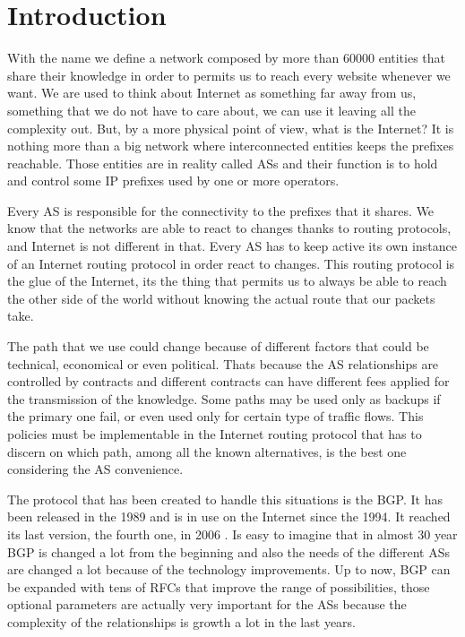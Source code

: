 \chapter{Introduction}
\label{cha:introduction}



With the name  we define a network composed by more than \num{60000}
entities that share their knowledge in order to permits us to reach every website
whenever we want.
We are used to think about Internet as something far away from us, something
that we do not have to care about, we can use it leaving all the complexity
out.
But, by a more physical point of view, what is the Internet? It is nothing
more than a big network where interconnected entities keeps the prefixes reachable.
Those entities are in reality called \acp{AS} and their function is to hold and
control some \ac{IP} prefixes used by one or more operators.

Every \ac{AS} is responsible for the connectivity to the prefixes that it shares.
We know that the networks are able to react to changes thanks to routing protocols,
and Internet is not different in that.
Every \ac{AS} has to keep active its own instance of an Internet routing protocol
in order react to changes.
This routing protocol is the glue of the Internet, its the thing that permits
us to always be able to reach the other side of the world without knowing
the actual route that our packets take.

The path that we use could change because of different factors that could
be technical, economical or even political.
Thats because the \ac{AS} relationships are controlled by contracts and different
contracts can have different fees applied for the transmission of the knowledge.
Some paths may be used only as backups if the primary one fail, or even used
only for certain type of traffic flows.
This policies must be implementable in the Internet routing protocol that has
to discern on which path, among all the known alternatives, is the best one
considering the \ac{AS} convenience.

The protocol that has been created to handle this situations is the \ac{BGP}.
It has been released in the \num{1989} and is in use on the Internet since
the \num{1994}.
It reached its last version, the fourth one, in \num{2006} \cite{rfc4271}.
Is easy to imagine that in almost \num{30} year \ac{BGP} is changed a lot from
the beginning and also the needs of the different \acp{AS} are changed a lot
because of the technology improvements.
Up to now, \ac{BGP} can be expanded with tens of \acp{RFC} that improve the
range of possibilities, those optional parameters are actually very important
for the \acp{AS} because the complexity of the relationships is growth a lot
in the last years.

